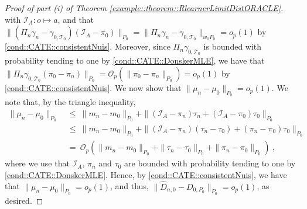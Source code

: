 \documentclass[11pt]{article}
\theoremstyle{definition}
\begin{document}
\begin{proof}[Proof of part (i) of Theorem   \ref{example::theorem::RlearnerLimitDistORACLE}]
with $\mathcal{I}_A: o \mapsto a$, and that $\|(\Pi_n \gamma_n - \gamma_{0, \mathcal{T}_0})(\mathcal{I}_A- \pi_0)\|_{P_0} = \|\Pi_n \gamma_n - \gamma_{0, \mathcal{T}_0}\|_{w_0 P_0} = o_p(1)$ by \ref{cond::CATE::consistentNuis}. Moreover, since $\Pi_n \gamma_{0, \mathcal{T}_0}$ is bounded with probability tending to one by \ref{cond::CATE::DonskerMLE}, we have that $\| \Pi_n \gamma_{0, \mathcal{T}_0}(\pi_0 - \pi_n)  \|_{P_0} =\mathcal{O}_p\left( \|\pi_0 - \pi_n  \|_{P_0}\right) = o_p(1)$ by \ref{cond::CATE::consistentNuis}. We now show that $\|\mu_n - \mu_0\|_{P_0} = o_p(1)$. We note that, by the triangle inequality, \begin{align*}
    \|\mu_n - \mu_0\|_{P_0}\ &\leq\ \|m_n - m_0\|_{P_0} + \| (\mathcal{I}_A-\pi_n)\tau_n +  (\mathcal{I}_A - \pi_0)\tau_0 \|_{P_0}\\
    &\leq\ \|m_n - m_0\|_{P_0} +\| (\mathcal{I}_A-\pi_n)(\tau_n-\tau_0) +  (\pi_n - \pi_0)\tau_0 \|_{P_0}\\
    &=\ \mathcal{O}_p\left(\|m_n - m_0\|_{P_0} +\|\tau_n - \tau_0\|_{P_0} + \| \pi_n - \pi_0\|_{P_0}\right)\ ,
\end{align*} where we use that $\mathcal{I}_A$, $\pi_n$ and $\tau_0$ are bounded with probability tending to one by \ref{cond::CATE::DonskerMLE}.  Hence, by \ref{cond::CATE::consistentNuis}, we have that $\|\mu_n - \mu_0\|_{P_0}= o_p(1)$, and thus,  $\|\widehat D_{n,0} - D_{0,P_0}\|_{P_0} = o_p(1)$, as desired. 


\end{proof}
\end{document}

